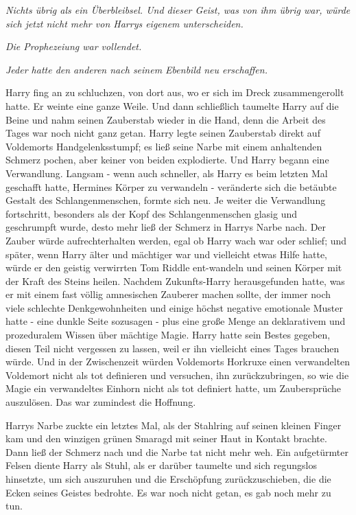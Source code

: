 {\emph{Nichts übrig als ein Überbleibsel. Und dieser Geist, was von ihm übrig war, würde sich jetzt nicht mehr von Harrys eigenem unterscheiden.}

\emph{Die Prophezeiung war vollendet.}

\emph{Jeder hatte den anderen nach seinem Ebenbild neu erschaffen.}

Harry fing an zu schluchzen, von dort aus, wo er sich im Dreck zusammengerollt hatte. Er weinte eine ganze Weile. Und dann schließlich taumelte Harry auf die Beine und nahm seinen Zauberstab wieder in die Hand, denn die Arbeit des Tages war noch nicht ganz getan. Harry legte seinen Zauberstab direkt auf Voldemorts Handgelenksstumpf; es ließ seine Narbe mit einem anhaltenden Schmerz pochen, aber keiner von beiden explodierte. Und Harry begann eine Verwandlung. Langsam - wenn auch schneller, als Harry es beim letzten Mal geschafft hatte, Hermines Körper zu verwandeln - veränderte sich die betäubte Gestalt des Schlangenmenschen, formte sich neu. Je weiter die Verwandlung fortschritt, besonders als der Kopf des Schlangenmenschen glasig und geschrumpft wurde, desto mehr ließ der Schmerz in Harrys Narbe nach. Der Zauber würde aufrechterhalten werden, egal ob Harry wach war oder schlief; und später, wenn Harry älter und mächtiger war und vielleicht etwas Hilfe hatte, würde er den geistig verwirrten Tom Riddle ent-wandeln und seinen Körper mit der Kraft des Steins heilen. Nachdem Zukunfts-Harry herausgefunden hatte, was er mit einem fast völlig amnesischen Zauberer machen sollte, der immer noch viele schlechte Denkgewohnheiten und einige höchst negative emotionale Muster hatte - eine dunkle Seite sozusagen - plus eine große Menge an deklarativem und prozeduralem Wissen über mächtige Magie. Harry hatte sein Bestes gegeben, diesen Teil nicht vergessen zu lassen, weil er ihn vielleicht eines Tages brauchen würde. Und in der Zwischenzeit würden Voldemorts Horkruxe einen verwandelten Voldemort nicht als tot definieren und versuchen, ihn zurückzubringen, so wie die Magie ein verwandeltes Einhorn nicht als tot definiert hatte, um Zaubersprüche auszulösen. Das war zumindest die Hoffnung.

Harrys Narbe zuckte ein letztes Mal, als der Stahlring auf seinen kleinen Finger kam und den winzigen grünen Smaragd mit seiner Haut in Kontakt brachte. Dann ließ der Schmerz nach und die Narbe tat nicht mehr weh. Ein aufgetürmter Felsen diente Harry als Stuhl, als er darüber taumelte und sich regungslos hinsetzte, um sich auszuruhen und die Erschöpfung zurückzuschieben, die die Ecken seines Geistes bedrohte. Es war noch nicht getan, es gab noch mehr zu tun.

}
